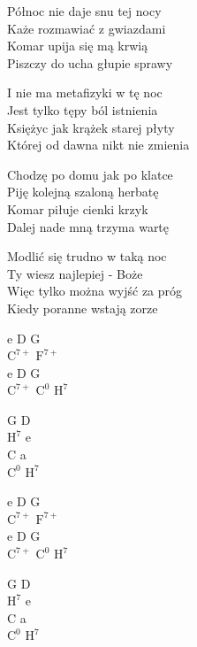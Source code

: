 \begin{text}
    Północ nie daje snu tej nocy\\
    Każe rozmawiać z gwiazdami\\
    Komar upija się mą krwią\\
    Piszczy do ucha głupie sprawy

    I nie ma metafizyki w tę noc\\
    Jest tylko tępy ból istnienia\\
    Księżyc jak krążek starej płyty\\
    Której od dawna nikt nie zmienia

    Chodzę po domu jak po klatce\\
    Piję kolejną szaloną herbatę\\
    Komar piłuje cienki krzyk\\
    Dalej nade mną trzyma wartę

    Modlić się trudno w taką noc\\
    Ty wiesz najlepiej - Boże\\
    Więc tylko można wyjść za próg\\
    Kiedy poranne wstają zorze
\end{text}
\begin{chord}
    e D G\\
    $\mathrm{C^{7+}}$ $\mathrm{F^{7+}}$\\
    e D G\\
    $\mathrm{C^{7+}}$ $\mathrm{C^{0}}$ $\mathrm{H^{7}}$

    G D\\
    $\mathrm{H^{7}}$ e\\
    C a\\
    $\mathrm{C^{0}}$ $\mathrm{H^{7}}$

    e D G\\
    $\mathrm{C^{7+}}$ $\mathrm{F^{7+}}$\\
    e D G\\
    $\mathrm{C^{7+}}$ $\mathrm{C^{0}}$ $\mathrm{H^{7}}$

    G D\\
    $\mathrm{H^{7}}$ e\\
    C a\\
    $\mathrm{C^{0}}$ $\mathrm{H^{7}}$
\end{chord}
